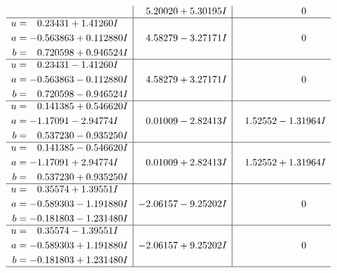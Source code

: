 \documentclass[1p]{elsarticle_modified}
\theoremstyle{definition}
\begin{document}
$$\begin{array}{c|c|c}
 & \phantom{-}5.20020 + 5.30195 I & \phantom{-0.000000 } 0 \\ \hline\begin{aligned}
u &= \phantom{-}0.23431 + 1.41260 I \\
a &= -0.563863 + 0.112880 I \\
b &= \phantom{-}0.720598 + 0.946524 I\end{aligned}
 & \phantom{-}4.58279 - 3.27171 I & \phantom{-0.000000 } 0 \\ \hline\begin{aligned}
u &= \phantom{-}0.23431 - 1.41260 I \\
a &= -0.563863 - 0.112880 I \\
b &= \phantom{-}0.720598 - 0.946524 I\end{aligned}
 & \phantom{-}4.58279 + 3.27171 I & \phantom{-0.000000 } 0 \\ \hline\begin{aligned}
u &= \phantom{-}0.141385 + 0.546620 I \\
a &= -1.17091 - 2.94774 I \\
b &= \phantom{-}0.537230 - 0.935250 I\end{aligned}
 & \phantom{-}0.01009 - 2.82413 I & \phantom{-}1.52552 - 1.31964 I \\ \hline\begin{aligned}
u &= \phantom{-}0.141385 - 0.546620 I \\
a &= -1.17091 + 2.94774 I \\
b &= \phantom{-}0.537230 + 0.935250 I\end{aligned}
 & \phantom{-}0.01009 + 2.82413 I & \phantom{-}1.52552 + 1.31964 I \\ \hline\begin{aligned}
u &= \phantom{-}0.35574 + 1.39551 I \\
a &= -0.589303 - 1.191880 I \\
b &= -0.181803 - 1.231480 I\end{aligned}
 & -2.06157 - 9.25202 I & \phantom{-0.000000 } 0 \\ \hline\begin{aligned}
u &= \phantom{-}0.35574 - 1.39551 I \\
a &= -0.589303 + 1.191880 I \\
b &= -0.181803 + 1.231480 I\end{aligned}
 & -2.06157 + 9.25202 I & \phantom{-0.000000 } 0\\
 \hline 
 \end{array}$$\newpage$$\begin{array}{c|c|c}  

\end{array}$$
\end{document}
